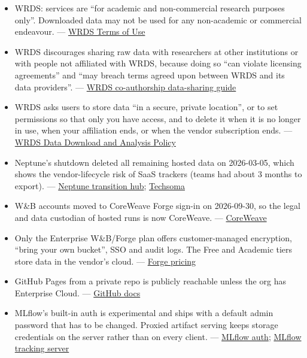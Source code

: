 \documentclass{article}
\begin{document}
\begin{itemize}

\item WRDS: services are ``for academic and non-commercial research purposes only''. Downloaded data may not be used for any non-academic or commercial endeavour. --- \href{https://wrds-www.wharton.upenn.edu/users/tou/}{WRDS Terms of Use}

\item WRDS discourages sharing raw data with researchers at other institutions or with people not affiliated with WRDS, because doing so ``can violate licensing agreements'' and ``may breach terms agreed upon between WRDS and its data providers''. --- \href{https://wrds-www.wharton.upenn.edu/pages/about/navigating-co-authorship-across-institutions-a-guide-to-data-sharing-and-compliance/}{WRDS co-authorship data-sharing guide}

\item WRDS asks users to store data ``in a secure, private location'', or to set permissions so that only you have access, and to delete it when it is no longer in use, when your affiliation ends, or when the vendor subscription ends. --- \href{https://wrds-www.wharton.upenn.edu/pages/about/data-download-and-analysis-policy/}{WRDS Data Download and Analysis Policy}

\item Neptune's shutdown deleted all remaining hosted data on 2026-03-05, which shows the vendor-lifecycle risk of SaaS trackers (teams had about 3 months to export). --- \href{https://docs.neptune.ai/transition_hub}{Neptune transition hub}; \href{https://techsoma.ca/openai-neptune-acquisition-shutdown/}{Techsoma}

\item W\&B accounts moved to CoreWeave Forge sign-in on 2026-09-30, so the legal and data custodian of hosted runs is now CoreWeave. --- \href{https://www.coreweave.com/companies/weights-and-biases}{CoreWeave}

\item Only the Enterprise W\&B/\allowbreak{}Forge plan offers customer-managed encryption, ``bring your own bucket'', SSO and audit logs. The Free and Academic tiers store data in the vendor's cloud. --- \href{https://coreweave.com/forge-pricing}{Forge pricing}

\item GitHub Pages from a private repo is publicly reachable unless the org has Enterprise Cloud. --- \href{https://docs.github.com/en/enterprise-cloud@latest/pages/getting-started-with-github-pages/changing-the-visibility-of-your-github-pages-site}{GitHub docs}

\item MLflow's built-in auth is experimental and ships with a default admin password that has to be changed. Proxied artifact serving keeps storage credentials on the server rather than on every client. --- \href{https://mlflow.org/docs/latest/self-hosting/security/basic-http-auth/}{MLflow auth}; \href{https://mlflow.org/docs/latest/self-hosting/architecture/tracking-server/}{MLflow tracking server}

\end{itemize}
\end{document}
